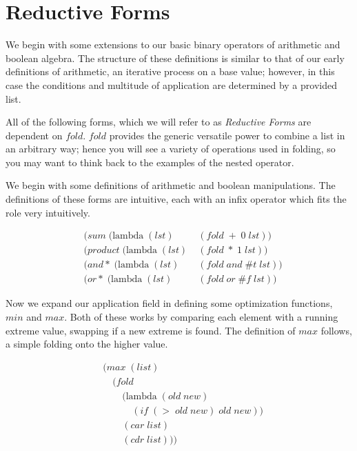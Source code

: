 \section{Reductive Forms}
We begin with some extensions to our basic binary operators of arithmetic and 
boolean algebra. The structure of these definitions is similar to that of our 
early definitions of arithmetic, an iterative process on a base value; however, in 
this case the conditions and multitude of application are determined by a provided 
list.

All of the following forms, which we will refer to as \emph{Reductive Forms} are 
dependent on $fold$. $fold$ provides the generic versatile power to combine a list 
in an arbitrary way; hence you will see a variety of operations used in folding, 
so you may want to think back to the examples of the nested operator.

We begin with some definitions of arithmetic and boolean manipulations. The 
definitions of these forms are intuitive, each with an infix operator which fits 
the role very intuitively.

\begin{figure}[ht]
\caption{}\label{scheme}
\begin{align*}
& (sum \; (\text{lambda} \; (lst) \; &(fold \; + \; 0 \; lst))
\\& (product \; (\text{lambda} \; (lst) \; &(fold \; * \; 1 \; lst))
\\& (and* \; (\text{lambda} \; (lst) \; &(fold \; and \; \#t \; lst))
\\& (or* \; (\text{lambda} \; (lst) \; &(fold \; or \; \#f \; lst))
\end{align*}
\end{figure}

Now we expand our application field in defining some optimization functions, $min$ 
and $max$. Both of these works by comparing each element with a running extreme 
value, swapping if a new extreme is found. The definition of $max$ follows, a 
simple folding onto the higher value.

\begin{figure}[ht]
\caption{}\label{scheme}
\begin{align*}
& (max \; (list)
\\& \quad (fold \; 
\\& \qquad (\text{lambda} \; (old \; new)
\\& \qquad \quad (if \; (> \; old \; new) \; old \; new))
\\& \qquad (car \; list)
\\& \qquad (cdr \; list)))
\end{align*}
\end{figure}

